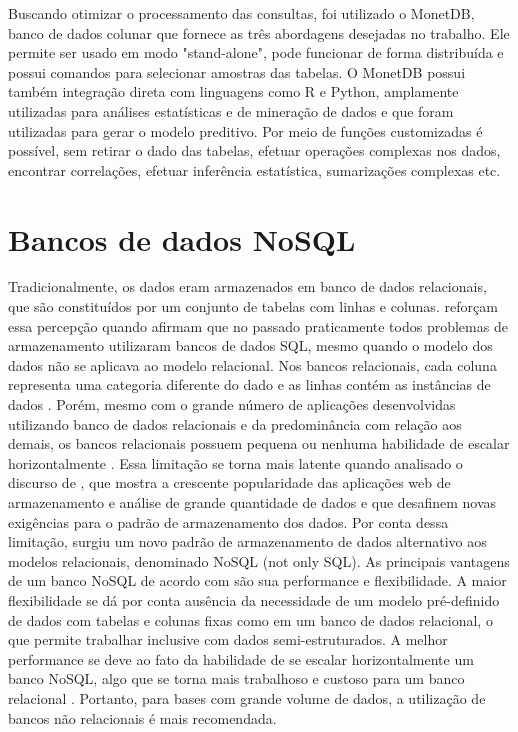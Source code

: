 \documentclass[12pt]{article}
\begin{document}
	Buscando otimizar o processamento das consultas, foi utilizado o MonetDB, banco de dados colunar que fornece as três abordagens desejadas no trabalho. Ele permite ser usado em modo "stand-alone", pode funcionar de forma distribuída e possui comandos para selecionar amostras das tabelas. O MonetDB possui também integração direta com linguagens como R e Python, amplamente utilizadas para análises estatísticas e de mineração de dados e que foram utilizadas para gerar o modelo preditivo. Por meio de funções customizadas é possível, sem retirar o dado das tabelas, efetuar operações complexas nos dados, encontrar correlações, efetuar inferência estatística, sumarizações complexas etc.


\section{Bancos de dados NoSQL} \label{sec:firstpage}


	Tradicionalmente, os dados eram armazenados em banco de  dados relacionais, que são constituídos por um conjunto de tabelas com linhas e colunas. \cite{Hecht:2011} reforçam essa percepção quando afirmam que no passado praticamente todos problemas de armazenamento utilizaram bancos de dados SQL, mesmo quando o modelo dos dados não se aplicava ao modelo relacional. Nos bancos relacionais, cada coluna representa uma categoria diferente do dado e as linhas contém as instâncias de dados \cite{Leavitt:2010}. Porém, mesmo com o grande número de aplicações desenvolvidas utilizando banco de dados relacionais e da predominância com relação aos demais, os bancos relacionais possuem pequena ou nenhuma habilidade de escalar horizontalmente \cite{Cattell:2010}. Essa limitação se torna mais latente quando analisado o discurso de \cite{Corbelini:2017}, que mostra a crescente popularidade das aplicações web de armazenamento e análise de grande quantidade de dados e que desafinem novas exigências para o padrão de armazenamento dos dados. Por conta dessa limitação, surgiu um novo padrão de armazenamento de dados alternativo aos modelos relacionais, denominado NoSQL (not only SQL).  As principais vantagens de um banco NoSQL de acordo com \cite{Stonebreaker:2010}são sua performance e flexibilidade. A maior flexibilidade se dá por conta ausência da necessidade de um modelo pré-definido de dados com tabelas e colunas fixas como em um banco de dados relacional, o que permite trabalhar inclusive com dados semi-estruturados. A melhor performance se deve ao fato da habilidade de se escalar horizontalmente um banco NoSQL, algo que se torna mais trabalhoso e custoso para um banco relacional \cite{Leavitt:2010}. Portanto, para bases com grande volume de dados, a utilização de bancos não relacionais é mais recomendada.\newline
    
\end{document}
